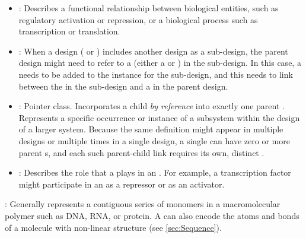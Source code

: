\begin{description}
\begin{itemize}
\item \emph{}:
Describes a functional relationship between biological entities, such as regulatory activation or repression, or a biological process such as transcription or translation.

\item \emph{}:
When a design ( or ) includes another design as a sub-design, the parent design might need to refer to a  (either a  or ) in the sub-design.
In this case, a  needs to be added to the instance for the sub-design, and this  needs to link between the  in the sub-design and a  in the parent design.

\item \emph{}:
Pointer class. Incorporates a child  \textit{by reference} into exactly one parent . Represents a specific occurrence or instance of a subsystem within the design of a larger system. Because the same definition might appear in multiple designs or multiple times in a single design, a single  can have zero or more parent s, and each such parent-child link requires its own, distinct .

\item \emph{}:
Describes the role that a  plays in an .
For example, a transcription factor might participate in an  as a repressor or as an activator.

\end{itemize}

\item \emph{}:
Generally represents a contiguous series of monomers in a macromolecular polymer such as DNA, RNA, or protein. A  can also encode the atoms and bonds of a molecule with non-linear structure (see \ref{sec:Sequence}).

\end{description}
